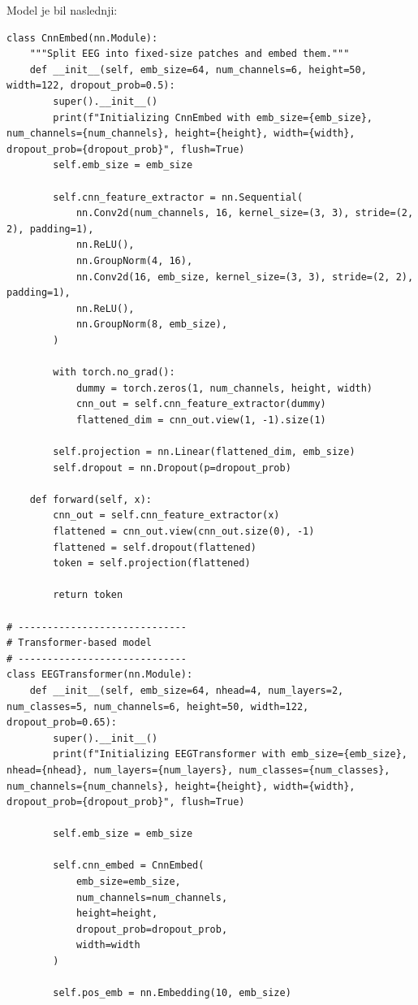 Model je bil naslednji:
\begin{verbatim}
class CnnEmbed(nn.Module):
    """Split EEG into fixed-size patches and embed them."""
    def __init__(self, emb_size=64, num_channels=6, height=50, width=122, dropout_prob=0.5):
        super().__init__()
        print(f"Initializing CnnEmbed with emb_size={emb_size}, num_channels={num_channels}, height={height}, width={width}, dropout_prob={dropout_prob}", flush=True)
        self.emb_size = emb_size

        self.cnn_feature_extractor = nn.Sequential(
            nn.Conv2d(num_channels, 16, kernel_size=(3, 3), stride=(2, 2), padding=1),
            nn.ReLU(),
            nn.GroupNorm(4, 16),
            nn.Conv2d(16, emb_size, kernel_size=(3, 3), stride=(2, 2), padding=1),
            nn.ReLU(),
            nn.GroupNorm(8, emb_size),
        )

        with torch.no_grad():
            dummy = torch.zeros(1, num_channels, height, width)
            cnn_out = self.cnn_feature_extractor(dummy)
            flattened_dim = cnn_out.view(1, -1).size(1)

        self.projection = nn.Linear(flattened_dim, emb_size)
        self.dropout = nn.Dropout(p=dropout_prob)

    def forward(self, x):
        cnn_out = self.cnn_feature_extractor(x)
        flattened = cnn_out.view(cnn_out.size(0), -1)
        flattened = self.dropout(flattened)
        token = self.projection(flattened)

        return token

# -----------------------------
# Transformer-based model
# -----------------------------
class EEGTransformer(nn.Module):
    def __init__(self, emb_size=64, nhead=4, num_layers=2, num_classes=5, num_channels=6, height=50, width=122, dropout_prob=0.65):
        super().__init__()
        print(f"Initializing EEGTransformer with emb_size={emb_size}, nhead={nhead}, num_layers={num_layers}, num_classes={num_classes}, num_channels={num_channels}, height={height}, width={width}, dropout_prob={dropout_prob}", flush=True)

        self.emb_size = emb_size

        self.cnn_embed = CnnEmbed(
            emb_size=emb_size,
            num_channels=num_channels,
            height=height,
            dropout_prob=dropout_prob,
            width=width
        )

        self.pos_emb = nn.Embedding(10, emb_size)


\end{verbatim}
